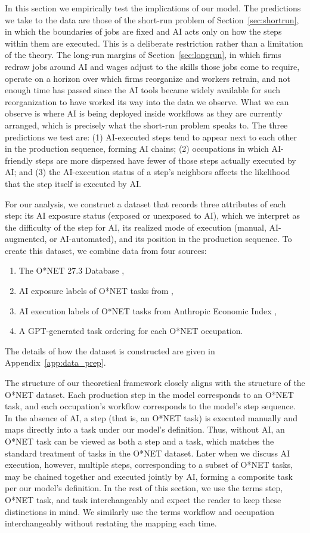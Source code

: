 In this section we empirically test the implications of our model.
The predictions we take to the data are those of the short-run problem of Section~\ref{sec:shortrun}, in which the boundaries of jobs are fixed and AI acts only on how the steps within them are executed.
This is a deliberate restriction rather than a limitation of the theory.
The long-run margins of Section~\ref{sec:longrun}, in which firms redraw jobs around AI and wages adjust to the skills those jobs come to require, operate on a horizon over which firms reorganize and workers retrain, and not enough time has passed since the AI tools became widely available for such reorganization to have worked its way into the data we observe.
What we can observe is where AI is being deployed inside workflows as they are currently arranged, which is precisely what the short-run problem speaks to.
The three predictions we test are: (1) AI-executed steps tend to appear next to each other in the production sequence, forming AI chains; (2) occupations in which AI-friendly steps are more dispersed have fewer of those steps actually executed by AI; and (3) the AI-execution status of a step's neighbors affects the likelihood that the step itself is executed by AI.

For our analysis, we construct a dataset that records three attributes of each step: its AI exposure status (exposed or unexposed to AI), which we interpret as the difficulty of the step for AI, its realized mode of execution (manual, AI-augmented, or AI-automated), and its position in the production sequence.
To create this dataset, we combine data from four sources:
\begin{enumerate}
    \item The O*NET 27.3 Database \citep{onet27_3},
    \item AI exposure labels of O*NET tasks from \cite{eloundou2023gpts},
    \item AI execution labels of O*NET tasks from Anthropic Economic Index \citep{handa2025economictasksperformedai},
    \item A GPT-generated task ordering for each O*NET occupation.
\end{enumerate}
The details of how the dataset is constructed are given in Appendix~\ref{app:data_prep}.

The structure of our theoretical framework closely aligns with the structure of the O*NET dataset.
Each production step in the model corresponds to an O*NET task, and each occupation's workflow corresponds to the model's step sequence.
In the absence of AI, a step (that is, an O*NET task) is executed manually and maps directly into a task under our model's definition.
Thus, without AI, an O*NET task can be viewed as both a step and a task, which matches the standard treatment of tasks in the O*NET dataset.
Later when we discuss AI execution, however, multiple steps, corresponding to a subset of O*NET tasks, may be chained together and executed jointly by AI, forming a composite task per our model's definition.
In the rest of this section, we use the terms step, O*NET task, and task interchangeably and expect the reader to keep these distinctions in mind.
We similarly use the terms workflow and occupation interchangeably without restating the mapping each time.


